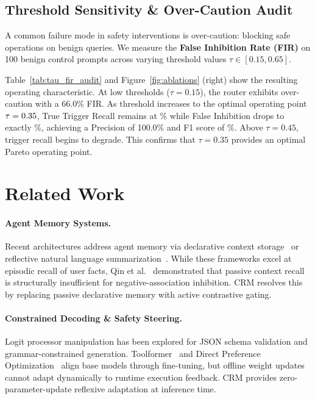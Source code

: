 \documentclass[10pt,conference]{IEEEtran}
\begin{document}


\subsection{Threshold Sensitivity \& Over-Caution Audit}

A common failure mode in safety interventions is over-caution: blocking safe operations on benign queries. We measure the \textbf{False Inhibition Rate (FIR)} on 100 benign control prompts across varying threshold values $\tau \in [0.15, 0.65]$.

Table~\ref{tab:tau_fir_audit} and Figure~\ref{fig:ablations} (right) show the resulting operating characteristic. At low thresholds ($\tau = 0.15$), the router exhibits over-caution with a 66.0\% FIR. As threshold increases to the optimal operating point $\tau = 0.35$, True Trigger Recall remains at \ValOptimalTauRecall\% while False Inhibition drops to exactly \ValOptimalTauFIR\%, achieving a Precision of 100.0\% and F1 score of \ValOptimalTauFOne\%. Above $\tau = 0.45$, trigger recall begins to degrade. This confirms that $\tau = 0.35$ provides an optimal Pareto operating point.



\section{Related Work}

\paragraph{Agent Memory Systems.}
Recent architectures address agent memory via declarative context storage~\cite{packer2023memgpt,chhikara2024mem0} or reflective natural language summarization~\cite{shinn2023reflexion}. While these frameworks excel at episodic recall of user facts, Qin et al.~\cite{qin2026implicitmembench} demonstrated that passive context recall is structurally insufficient for negative-association inhibition. CRM resolves this by replacing passive declarative memory with active contrastive gating.

\paragraph{Constrained Decoding \& Safety Steering.}
Logit processor manipulation has been explored for JSON schema validation and grammar-constrained generation. Toolformer~\cite{schick2023toolformer} and Direct Preference Optimization~\cite{rafailov2023direct} align base models through fine-tuning, but offline weight updates cannot adapt dynamically to runtime execution feedback. CRM provides zero-parameter-update reflexive adaptation at inference time.
\end{document}
